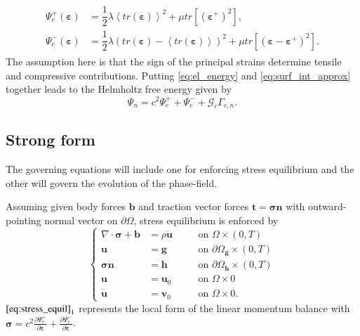 \begin{align} \label{eq:psi_e+-}
	\begin{aligned}
		\Psi_{e}^{+}\left(\bm{\varepsilon}\right) &= \dfrac{1}{2}\lambda\left<tr\left(\bm{\varepsilon}\right)\right>^{2}+\mu tr\left[\left(\bm{\varepsilon}^{+}\right)^{2}\right], \\
		\Psi_{e}^{-}\left(\bm{\varepsilon}\right) &= \dfrac{1}{2}\lambda\left(tr\left(\bm{\varepsilon}\right)-\left<tr\left(\bm{\varepsilon}\right)\right>\right)^{2}+\mu tr\left[\left(\bm{\varepsilon}-\bm{\varepsilon}^{+}\right)^{2}\right].
	\end{aligned}
\end{align}
The assumption here is that the sign of the principal strains determine tensile and compressive contributions. Putting \eqref{eq:el_energy} and \eqref{eq:surf_int_approx} together leads to the Helmholtz free energy given by
\begin{equation} \label{eq:Helmholtz}
	\Psi_{n}=c^{2}\Psi_{e}^{+}+\Psi_{e}^{-}+\mathcal{G}_{c}\Gamma_{c,n}.
\end{equation}

\subsection{Strong form} \label{sec:strong_form}
The governing equations will include one for enforcing stress equilibrium and the other will govern the evolution of the phase-field.

Assuming given body forces $\mathbf{b}$ and traction vector forces $\mathbf{t}=\bm{\sigma}\mathbf{n}$ with outward-pointing normal vector on $\partial\Omega$, stress equilibrium is enforced by
\begin{equation} \label{eq:stress_equil}
	 \left\{\begin{alignedat}{2}
\nabla\cdot\bm{\sigma}+\mathbf{b} &= \rho\ddot{\mathbf{u}} && \quad\text{on } \Omega\times\left(0,T\right) \\
		\mathbf{u} &= \mathbf{g} && \quad\text{on } \partial\Omega_{\mathbf{g}}\times\left(0,T\right) \\
		\bm{\sigma}\mathbf{n} &= \mathbf{h} && \quad\text{on } \partial\Omega_{\mathbf{h}}\times\left(0,T\right) \\
		\mathbf{u} &= \mathbf{u}_{0} && \quad\text{on } \Omega\times0 \\
		\dot{\mathbf{u}} &= \mathbf{v}_{0} && \quad\text{on } \Omega\times0.
  \end{alignedat}\right.
\end{equation}
$\eqref{eq:stress_equil}_{1}$ represents the local form of the linear momentum balance with $\bm{\sigma}=c^{2}\frac{\partial\Psi_{e}^{+}}{\partial\bm{\varepsilon}}+\frac{\partial\Psi_{e}^{-}}{\partial\bm{\varepsilon}}$.

